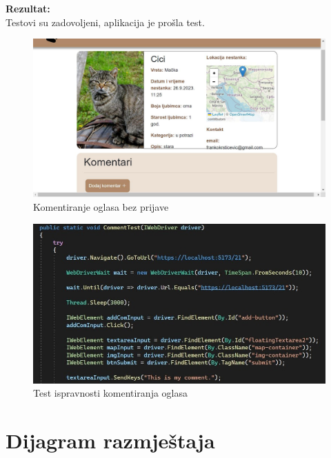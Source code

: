 			\noindent \textbf{Rezultat:}\\
			Testovi su zadovoljeni, aplikacija je prošla test.\\
			\begin{figure}[H]
				\includegraphics[width=\textwidth]{komentar_bez_prijave.JPEG}
				\centering
				\caption{Komentiranje oglasa bez prijave}
				\label{fig:komentiranjeoglasabezprijave}
			\end{figure}
			\begin{figure}[H]
				\includegraphics[width=\textwidth]{2test_postcomment.JPEG}
				\centering
				\caption{Test ispravnosti komentiranja oglasa}
				\label{fig:testkomentar}
			\end{figure}
			
			\eject 
		
		
		\section{Dijagram razmještaja}
			
			
			
